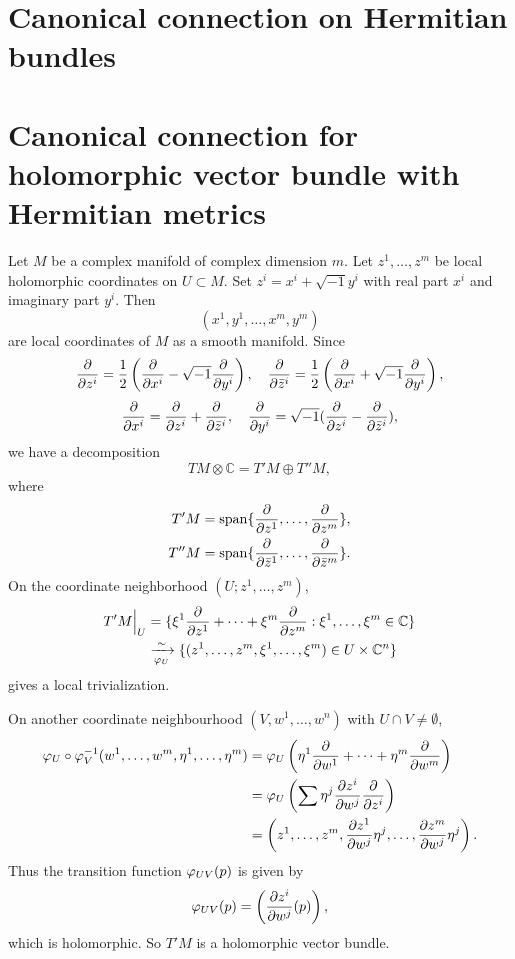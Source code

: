 \documentclass[12pt]{article}
\begin{document}
  \section{Canonical connection on Hermitian bundles}
\else
  \section{Canonical connection for holomorphic vector bundle with Hermitian metrics}
\fi

Let \(M\) be a complex manifold of complex dimension \(m\). Let \(z^1,\ldots,z^m\)
be local holomorphic coordinates on \(U\subset M\). Set \(z^i=x^i+\sqrt{-1}y^i\) with
real part \(x^i\) and imaginary part \(y^i\). Then \[
  (x^1,y^1,\ldots,x^m,y^m)
\] are local coordinates of \(M\) as a smooth manifold. Since \[
  \pdv{}{z^i}=\frac{1}{2}\left(\pdv{}{x^i}-\sqrt{-1}\pdv{}{y^i}\right),\quad
  \pdv{}{\bar{z}^i}=\frac{1}{2}\left(\pdv{}{x^i}+\sqrt{-1}\pdv{}{y^i}\right),
\] \[
  \pdv{}{x^i}=\pdv{}{z^i}+\pdv{}{\bar{z}^i},\quad
  \pdv{}{y^i}=\sqrt{-1}(\pdv{}{z^i}-\pdv{}{\bar{z}^i}),
\] we have a decomposition \[
  TM\otimes \mathbb{C}=T'M\oplus T''M
,\] where
\begin{align*}
  T'M&=\operatorname{span}\{\pdv{}{z^1},\ldots,\pdv{}{z^m}\}, \\
  T''M&=\operatorname{span}\{\pdv{}{\bar{z}^1},\ldots,\pdv{}{\bar{z}^m}\}
.\end{align*}
On the coordinate neighborhood \((U;z^1,\ldots,z^m)\),
\begin{align*}
  T'M\Big|_U&=\{\xi^1\pdv{}{z^1}+\cdots +\xi^m\pdv{}{z^m}:
  \xi^1,\ldots,\xi^m\in \mathbb{C}\} \\
  &\xrightarrow[\varphi_U]{\sim}\{(z^1,\ldots,z^m,\xi^1,\ldots,\xi^m)\in
  U\times \mathbb{C}^n\}
\end{align*}
gives a local trivialization.

On another coordinate neighbourhood \((V,w^1,\ldots,w^n)\) with \(U\cap V\neq
\emptyset\),
\begin{align*}
  \varphi_U\circ \varphi_V^{-1}(w^1,\ldots,w^m,\eta^1,\ldots,\eta^m)
  &=\varphi_U\left(\eta^1\pdv{}{w^1}+\cdots+\eta^m\pdv{}{w^m}\right) \\
  &=\varphi_U\left(\sum \eta^j\pdv{z^i}{w^j}\pdv{}{z^i}\right) \\
  &=\left(z^1,\ldots,z^m,\pdv{z^1}{w^j}\eta^j,\ldots,\pdv{z^m}{w^j}\eta^j\right)
.\end{align*}
Thus the transition function \(\varphi_{UV}(p)\) is given by \[
  \varphi_{UV}(p)=\left(\pdv{z^i}{w^j}(p)\right)
,\] which is holomorphic. So \(T'M\) is a holomorphic vector bundle.
\end{document}

